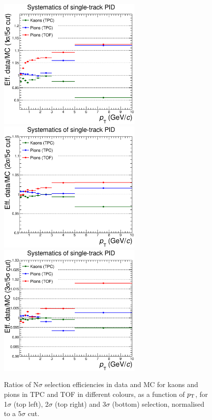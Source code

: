 \begin{figure}[!h]
 \centering
 \includegraphics[angle=0, width=7cm]{./FigCap5/PIDsyst_1over5sigmaCut.eps}
 \includegraphics[angle=0, width=7cm]{./FigCap5/PIDsyst_2over5sigmaCut.eps}
 \includegraphics[angle=0, width=7cm]{./FigCap5/PIDsyst_3over5sigmaCut.eps}
 \caption{Ratios of N$\sigma$ selection efficiencies in data and MC for kaons and pions in TPC and TOF in different colours, as a function of $p_{\rm T}$, for 1$\sigma$ (top left), 2$\sigma$ (top right) and 3$\sigma$ (bottom) selection, normalised to a 5$\sigma$ cut. }
 \label{fig:PerTrackPIDsys} 
\end{figure}

